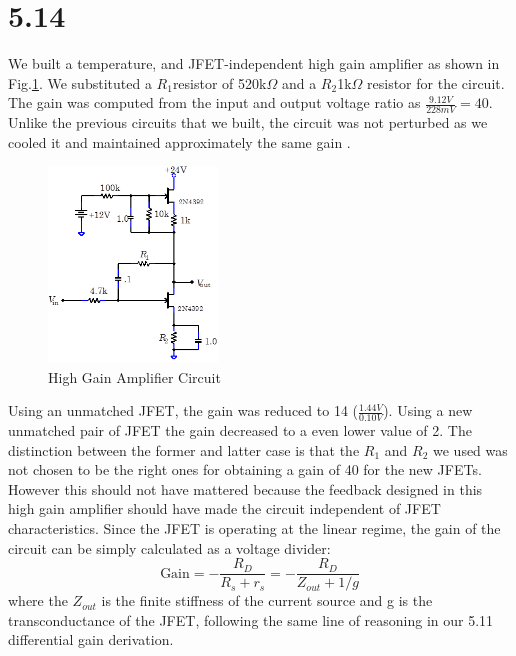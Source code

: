 \documentclass[authoryear, 12pt,5p, times]{elsarticle}
\begin{document}
\section*{5.14}
We built a temperature, and JFET-independent high gain amplifier as shown in Fig.\ref{q14setup}. We substituted a $R_1$resistor of 520k$\Omega$ and a  $R_2$1k$\Omega$ resistor for the circuit. The gain was computed from the input and output voltage ratio as $\frac{9.12V}{228mV}=40$. Unlike the previous circuits that we built, the circuit was not perturbed as we cooled it and maintained approximately the same gain .
\begin{figure}[h!]
 \centering
 \includegraphics[width=0.4\textwidth]{figure/q14setup}
\caption{High Gain Amplifier Circuit}
\label{q14setup}
\end{figure}
\par Using an unmatched  JFET, the gain was reduced to 14 ($\frac{1.44V}{0.10V}$). Using a new unmatched pair of JFET the gain decreased to a even lower value of 2. The distinction between the former and latter case is that the $R_1$ and $R_2$ we used was not chosen to be the right ones for obtaining a gain of 40 for the new JFETs. However this should not have mattered because the feedback designed in this high gain amplifier should have made the circuit independent of JFET characteristics. Since the JFET is operating at the linear regime, the gain of the circuit can be simply calculated as a voltage divider:
\begin{equation}
\text{Gain} = -\frac{R_D}{R_s+r_s} = -\frac{R_D}{Z_{out}+1/g}
\end{equation}
where the $Z_{out}$ is the finite stiffness of the current source and g is the transconductance of the JFET, following the same line of reasoning in our  5.11 differential gain derivation.
\end{document}
